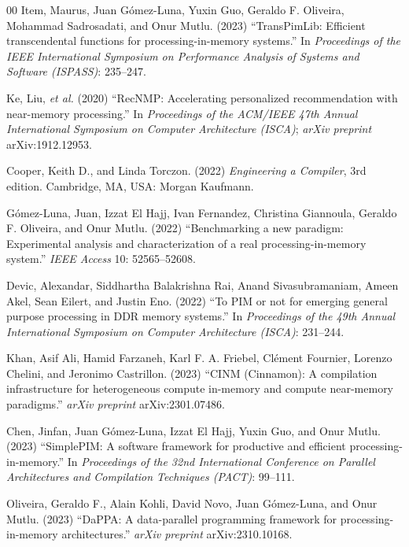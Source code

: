 \documentclass{ieeeaccess}
\begin{document}
\begin{thebibliography}{00}
 Item, Maurus, Juan G\'omez-Luna, Yuxin Guo, Geraldo F. Oliveira, Mohammad Sadrosadati, and Onur Mutlu. (2023) ``TransPimLib: Efficient transcendental functions for processing-in-memory systems.'' In \emph{Proceedings of the IEEE International Symposium on Performance Analysis of Systems and Software (ISPASS)}: 235--247.

 Ke, Liu, \emph{et al.} (2020) ``RecNMP: Accelerating personalized recommendation with near-memory processing.'' In \emph{Proceedings of the ACM/IEEE 47th Annual International Symposium on Computer Architecture (ISCA)}; \emph{arXiv preprint} arXiv:1912.12953.

 Cooper, Keith D., and Linda Torczon. (2022) \emph{Engineering a Compiler}, 3rd edition. Cambridge, MA, USA: Morgan Kaufmann.

 G\'omez-Luna, Juan, Izzat El Hajj, Ivan Fernandez, Christina Giannoula, Geraldo F. Oliveira, and Onur Mutlu. (2022) ``Benchmarking a new paradigm: Experimental analysis and characterization of a real processing-in-memory system.'' \emph{IEEE Access} 10: 52565--52608.

 Devic, Alexandar, Siddhartha Balakrishna Rai, Anand Sivasubramaniam, Ameen Akel, Sean Eilert, and Justin Eno. (2022) ``To PIM or not for emerging general purpose processing in DDR memory systems.'' In \emph{Proceedings of the 49th Annual International Symposium on Computer Architecture (ISCA)}: 231--244.

 Khan, Asif Ali, Hamid Farzaneh, Karl F. A. Friebel, Cl\'ement Fournier, Lorenzo Chelini, and Jeronimo Castrillon. (2023) ``CINM (Cinnamon): A compilation infrastructure for heterogeneous compute in-memory and compute near-memory paradigms.'' \emph{arXiv preprint} arXiv:2301.07486.

 Chen, Jinfan, Juan G\'omez-Luna, Izzat El Hajj, Yuxin Guo, and Onur Mutlu. (2023) ``SimplePIM: A software framework for productive and efficient processing-in-memory.'' In \emph{Proceedings of the 32nd International Conference on Parallel Architectures and Compilation Techniques (PACT)}: 99--111.

 Oliveira, Geraldo F., Alain Kohli, David Novo, Juan G\'omez-Luna, and Onur Mutlu. (2023) ``DaPPA: A data-parallel programming framework for processing-in-memory architectures.'' \emph{arXiv preprint} arXiv:2310.10168.


\end{thebibliography}
\end{document}
